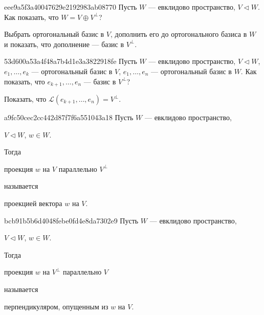 \begin{note}{eee9a5f3a40047629e2192983ab08770}
    Пусть \({ W }\) --- евклидово пространство, \({ V \triangleleft W }\).
    Как показать, что \({ W = V \oplus V^{\perp} }\)?

    \begin{cloze}{1}
        Выбрать ортогональный базис в \({ V }\), дополнить его до ортогонального базиса в \({ W }\) и показать, что дополнение --- базис в \({ V^{\perp} }\).
    \end{cloze}
\end{note}

\begin{note}{53d600a53a4f48a7b4d1e3a3822918fe}
    Пусть \({ W }\) --- евклидово пространство, \({ V \triangleleft W }\),
    \({ e_1, \ldots, e_k }\) --- ортогональный базис в \({ V }\), \({ e_1, \ldots, e_n }\) --- ортогональный базис в \({ W }\).
    Как показать, что \({ e_{k + 1}, \ldots, e_n }\) --- базис в \({ V^{\perp} }\)?

    \begin{cloze}{1}
        Показать, что \({ \mathscr L (e_{k + 1}, \ldots, e_n) = V^{\perp} }\).
    \end{cloze}
\end{note}

\begin{note}{a9fc50cec2cc442d87f7f6a551043a18}
    Пусть \({ W }\) --- евклидово пространство, \begin{icloze}{3}\({ V \triangleleft W }\), \({ w \in W }\).\end{icloze}
    Тогда \begin{icloze}{1}проекция \({ w }\) на \({ V }\) параллельно \({ V^{\perp} }\)\end{icloze} называется \begin{icloze}{2}проекцией вектора \({ w }\) на \({ V }\).\end{icloze}
\end{note}

\begin{note}{bcb91b5b6d4048febe0fd4e8da7302e9}
    Пусть \({ W }\) --- евклидово пространство, \begin{icloze}{3}\({ V \triangleleft W }\), \({ w \in W }\).\end{icloze}
    Тогда \begin{icloze}{1}проекция \({ w }\) на \({ V^{\perp} }\) параллельно \({ V }\)\end{icloze} называется \begin{icloze}{2}перпендикуляром, опущенным из \({ w }\) на \({ V }\).\end{icloze}
\end{note}


